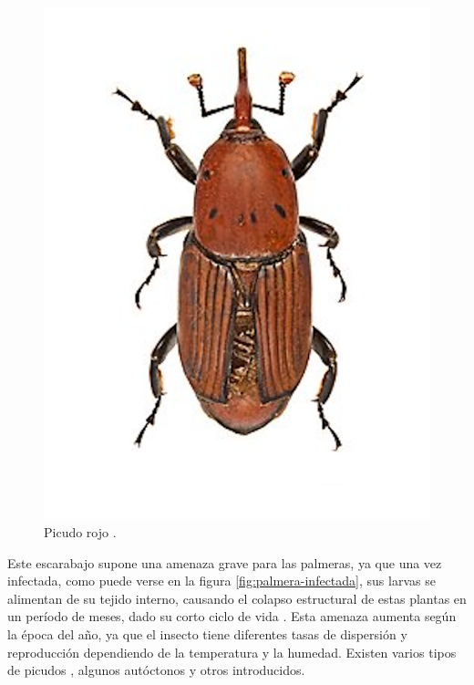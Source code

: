 \begin{figure}[htpb]
  \centering
  \includegraphics[scale=1]{./Figures/picudo-rojo.png}
  \caption{Picudo rojo \protect\footnotemark.}
  \label{fig:picudo-rojo}
\end{figure}


Este escarabajo supone una amenaza grave para las palmeras, ya que una vez infectada, como puede verse en la figura \ref{fig:palmera-infectada}, sus larvas se alimentan de su tejido interno, causando el colapso estructural de estas plantas en un período de meses, dado su corto ciclo de vida \citep{anticimex_picudo_nodate}. Esta amenaza aumenta según la época del año, ya que el insecto tiene diferentes tasas de dispersión y reproducción dependiendo de la temperatura y la humedad. Existen varios tipos de picudos \citep{poplin_palm_2014}, algunos autóctonos y otros introducidos.

